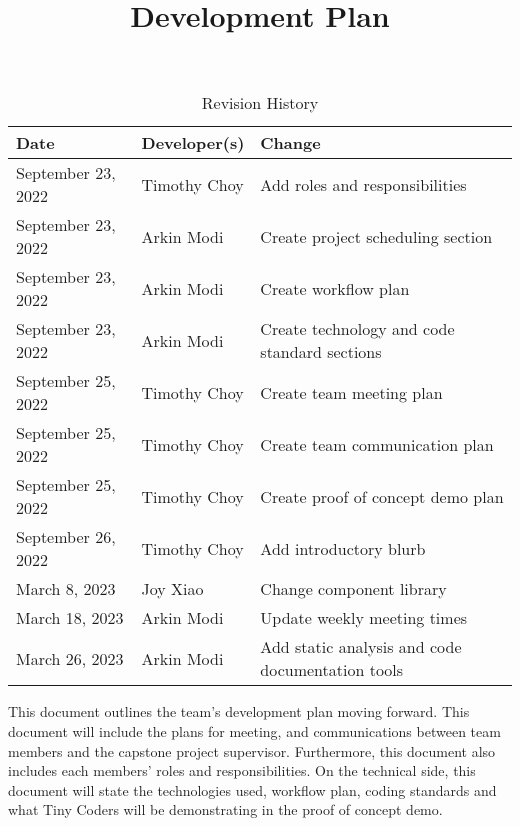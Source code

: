 \documentclass{article}
\title{Development Plan\\\progname}
\author{\authname}
\date{}
\begin{document}
\maketitle

\begin{table}[hp]
	\caption{Revision History} \label{TblRevisionHistory}
	\begin{tabularx}{\textwidth}{llX}
		\toprule
		\textbf{Date}      & \textbf{Developer(s)} & \textbf{Change}                                  \\
		\midrule
		September 23, 2022 & Timothy Choy          & Add roles and responsibilities                   \\
		September 23, 2022 & Arkin Modi            & Create project scheduling section                \\
		September 23, 2022 & Arkin Modi            & Create workflow plan                             \\
		September 23, 2022 & Arkin Modi            & Create technology and code standard sections     \\
		September 25, 2022 & Timothy Choy          & Create team meeting plan                         \\
		September 25, 2022 & Timothy Choy          & Create team communication plan                   \\
		September 25, 2022 & Timothy Choy          & Create proof of concept demo plan                \\
		September 26, 2022 & Timothy Choy          & Add introductory blurb                           \\
		March 8, 2023      & Joy Xiao              & Change component library                         \\
		March 18, 2023     & Arkin Modi            & Update weekly meeting times                      \\
		March 26, 2023     & Arkin Modi            & Add static analysis and code documentation tools \\
		\bottomrule
	\end{tabularx}
\end{table}

This document outlines the team's development plan moving forward. This document will include the
plans for meeting, and communications between team members and the capstone project supervisor.
Furthermore, this document also includes each members' roles and responsibilities. On the technical
side, this document will state the technologies used, workflow plan, coding standards and what Tiny
Coders will be demonstrating in the proof of concept demo.
\end{document}
